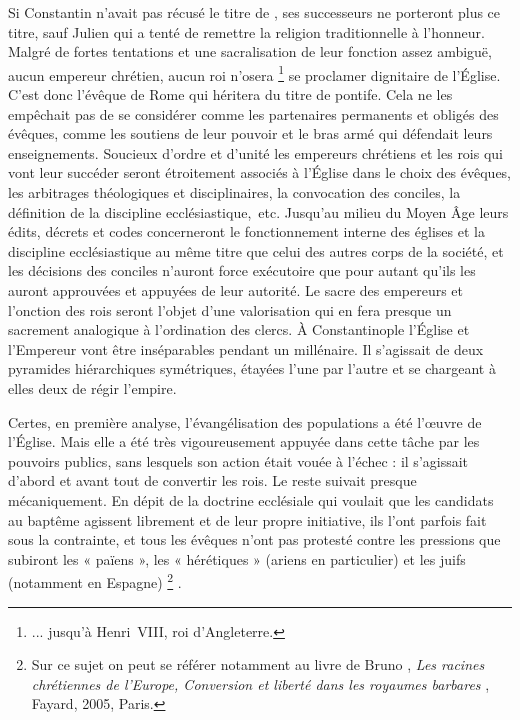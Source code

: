  Si Constantin n'avait pas récusé le titre de , ses successeurs ne porteront plus ce titre, sauf Julien qui a tenté de remettre la religion traditionnelle à l'honneur. Malgré de fortes tentations et une sacralisation de leur fonction assez ambiguë, aucun empereur chrétien, aucun roi n'osera%
\footnote{... jusqu'à Henri~VIII, roi d'Angleterre.} 
se proclamer dignitaire de l'Église. C'est donc l'évêque de Rome qui héritera du titre de pontife. Cela ne les empêchait pas de se considérer comme les partenaires permanents et obligés des évêques, comme les soutiens de leur pouvoir et le bras armé qui défendait leurs enseignements. Soucieux d'ordre et d'unité les empereurs chrétiens et les rois qui vont leur succéder seront étroitement associés à l'Église dans le choix des évêques, les arbitrages théologiques et disciplinaires, la convocation des conciles, la définition de la discipline ecclésiastique,~etc. Jusqu'au milieu du Moyen Âge leurs édits, décrets et codes concerneront le fonctionnement interne des églises et la discipline ecclésiastique au même titre que celui des autres corps de la société, et les décisions des conciles n'auront force exécutoire que pour autant qu'ils les auront approuvées et appuyées de leur autorité. Le sacre des empereurs et l'onction des rois seront l'objet d'une valorisation qui en fera presque un sacrement analogique à l'ordination des clercs. À Constantinople l'Église et l'Empereur vont être inséparables pendant un millénaire. Il s'agissait de deux pyramides hiérarchiques symétriques, étayées l'une par l'autre et se chargeant à elles deux de régir l'empire. 

 Certes, en première analyse, l'évangélisation des populations a été l'œuvre de l'Église. Mais elle a été très vigoureusement appuyée dans cette tâche par les pouvoirs publics, sans lesquels son action était vouée à l'échec : il s'agissait d'abord et avant tout de convertir les rois. Le reste suivait presque mécaniquement. En dépit de la doctrine ecclésiale qui voulait que les candidats au baptême agissent librement et de leur propre initiative, ils l'ont parfois fait sous la contrainte, et tous les évêques n'ont pas protesté contre les pressions que subiront les « païens », les « hérétiques » (ariens en particulier) et les juifs (notamment en Espagne)%
\footnote{Sur ce sujet on peut se référer notamment au livre de Bruno , \emph{Les racines chrétiennes de l'Europe, Conversion et liberté dans les royaumes barbares }, Fayard, 2005, Paris.}%
. 

